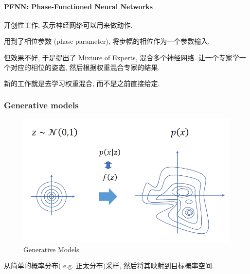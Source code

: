 \paragraph{PFNN: Phase-Functioned Neural Networks} 开创性工作, 表示神经网络可以用来做动作. 

用到了相位参数 (phase parameter), 将步幅的相位作为一个参数输入. 

但效果不好, 于是提出了 Mixture of Experts, 混合多个神经网络. 让一个专家学一个对应的相位的姿态, 然后根据权重混合专家的结果.

新的工作就是去学习权重混合, 而不是之前直接给定. 


\subsubsection{Generative models}
\begin{figure}[!htb]
    \centering
    \includegraphics[width=0.42\linewidth]{pic/1056/Generative Models}
    \caption{Generative Models}
\end{figure}
从简单的概率分布( e.g. 正太分布)采样, 然后将其映射到目标概率空间. 



